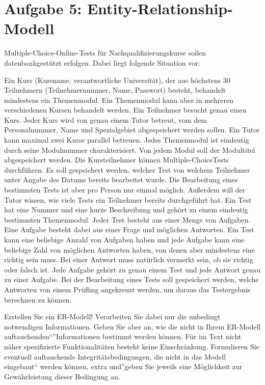 \documentclass{lehramt-informatik}
\begin{document}
%

\section{Aufgabe 5: Entity-Relationship-Modell}

Multiple-Choice-Online-Tests für Nachqualifizierungskurse sollen
datenbankgestützt erfolgen. Dabei liegt folgende Situation vor:

Ein Kurs (Kursname, verantwortliche Universität), der aus höchstens 30
Teilnehmern (Teilnehmernummer, Name, Passwort) besteht, behandelt
mindestens ein Themenmodul. Ein Themenmodul kann aber in mehreren
verschiedenen Kursen behandelt werden. Ein Teilnehmer besucht genau
einen Kurs. Jeder Kurs wird von genau einem Tutor betreut, vom dem
Personalnummer, Name und Spezialgebiet abgespeichert werden sollen. Ein
Tutor kann maximal zwei Kurse parallel betreuen. Jedes Themenmodul ist
eindeutig durch seine Modulnummer charakterisiert. Von jedem Modul soll
der Modultitel abgespeichert werden. Die Kursteilnehmer können
Multiple-ChoiceTests durchführen. Es soll gespeichert werden, welcher
Test von welchem Teilnehmer unter Angabe des Datums bereits bearbeitet
wurde. Die Bearbeitung eines bestimmten Tests ist aber pro Person nur
einmal möglich. Außerdem will der Tutor wissen, wie viele Tests ein
Teilnehmer bereits durchgeführt hat. Ein Test hat eine Nummer und eine
kurze Beschreibung und gehört zu einem eindeutig bestimmten Themenmodul.
Jeder Test besteht aus einer Menge von Aufgaben. Eine Aufgabe besteht
dabei aus einer Frage und möglichen Antworten. Ein Test kann eine
beliebige Anzahl von Aufgaben haben und jede Aufgabe kann eine beliebige
Zahl von möglichen Antworten haben, von denen aber mindestens eine
richtig sein muss. Bei einer Antwort muss natürlich vermerkt sein, ob
sie richtig oder falsch ist. Jede Aufgabe gehört zu genau einem Test und
jede Antwort genau zu einer Aufgabe. Bei der Bearbeitung eines Tests
soll gespeichert werden, welche Antworten von einem Prüfling angekreuzt
werden, um daraus das Testergebnis berechnen zu können.

Erstellen Sie ein ER-Modell! Verarbeiten Sie dabei nur die unbedingt
notwendigen Informationen. Geben Sie aber an, wie die nicht in Ihrem
ER-Modell auftauchenden“”Informationen bestimmt werden können. Für im
Text nicht näher spezifizierte Funktionalitäten besteht keine
Einschränkung. Formulieren Sie eventuell auftauchende
Integritätsbedingungen, die nicht in das Modell eingebaut“ werden
können, extra und”geben Sie jeweils eine Möglichkeit zur Gewährleistung
dieser Bedingung an.
\end{document}

